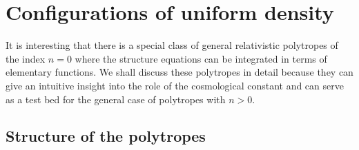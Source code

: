 
\chapter{Configurations of uniform density}\label{Chap:Uniform}

It is interesting that there is a special class of general relativistic
polytropes of the index $n = 0$ where the structure equations can be
integrated in terms of elementary functions. We shall discuss these polytropes
in detail because they can give an intuitive insight into the role of the
cosmological constant and can serve as a test bed for the general case of
polytropes with $n>0$.

\section{Structure of the polytropes}\label{Sec:UniStr}

